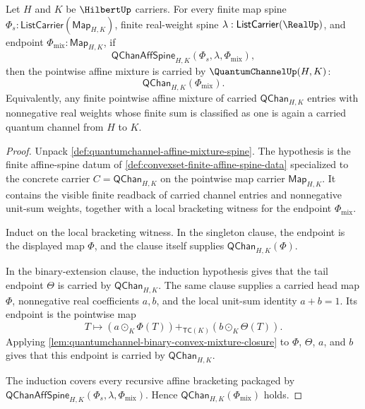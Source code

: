 \begin{theorem}
\label{thm:quantumchannel-finite-convex-mixture-closure}
Let $H$ and $K$ be $\HilbertUp$ carriers. For every finite map spine $\Phi_s:\mathsf{ListCarrier}(\mathsf{Map}_{H,K})$, finite real-weight spine $\lambda:\mathsf{ListCarrier}(\RealUp)$, and endpoint $\Phi_{\mathrm{mix}}:\mathsf{Map}_{H,K}$, if
$$
\mathsf{QChanAffSpine}_{H,K}(\Phi_s,\lambda,\Phi_{\mathrm{mix}}),
$$
then the pointwise affine mixture is carried by $\QuantumChannelUp(H,K)$:
$$
\mathsf{QChan}_{H,K}(\Phi_{\mathrm{mix}}).
$$
Equivalently, any finite pointwise affine mixture of carried $\mathsf{QChan}_{H,K}$ entries with nonnegative real weights whose finite sum is classified as one is again a carried quantum channel from $H$ to $K$.
\end{theorem}
\begin{proof}
Unpack \autoref{def:quantumchannel-affine-mixture-spine}. The hypothesis is the finite affine-spine datum of \autoref{def:convexset-finite-affine-spine-data} specialized to the concrete carrier $C=\mathsf{QChan}_{H,K}$ on the pointwise map carrier $\mathsf{Map}_{H,K}$. It contains the visible finite readback of carried channel entries and nonnegative unit-sum weights, together with a local bracketing witness for the endpoint $\Phi_{\mathrm{mix}}$.

Induct on the local bracketing witness. In the singleton clause, the endpoint is the displayed map $\Phi$, and the clause itself supplies $\mathsf{QChan}_{H,K}(\Phi)$.

In the binary-extension clause, the induction hypothesis gives that the tail endpoint $\Theta$ is carried by $\mathsf{QChan}_{H,K}$. The same clause supplies a carried head map $\Phi$, nonnegative real coefficients $a,b$, and the local unit-sum identity $a+b=1$. Its endpoint is the pointwise map
$$
T\longmapsto (a\odot_K\Phi(T))+_{\mathsf{TC}(K)}(b\odot_K\Theta(T)).
$$
Applying \autoref{lem:quantumchannel-binary-convex-mixture-closure} to $\Phi$, $\Theta$, $a$, and $b$ gives that this endpoint is carried by $\mathsf{QChan}_{H,K}$.

The induction covers every recursive affine bracketing packaged by $\mathsf{QChanAffSpine}_{H,K}(\Phi_s,\lambda,\Phi_{\mathrm{mix}})$. Hence $\mathsf{QChan}_{H,K}(\Phi_{\mathrm{mix}})$ holds.
\end{proof}

